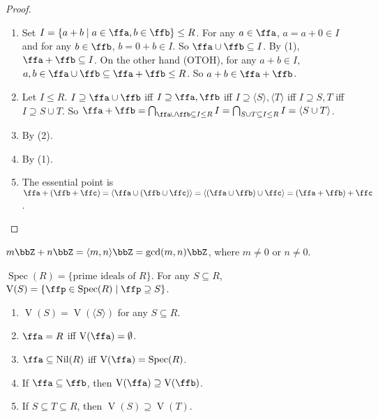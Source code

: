 \begin{proof}
    \begin{enumerate}[(1)]
        \item 
            Set $I = \{a+b \mid a \in \ffa,b \in \ffb\} \leq R$. For any $a \in \ffa$, $a = a + 0 \in I$ and for any $b \in \ffb$, $b = 0 + b \in I$. So $\ffa \cup \ffb \subseteq I$. By (1), $\ffa + \ffb \subseteq I$. On the other hand (OTOH), for any $a+b \in I$, $a,b \in \ffa \cup \ffb \subseteq \ffa + \ffb \leq R$. So $a + b \in \ffa + \ffb$.
        \item Let $I \leq R$. $I \supseteq \ffa \cup \ffb$ iff $I \supseteq \ffa,\ffb$ iff $I \supseteq \langle S \rangle, \langle T \rangle$ iff $I \supseteq S,T$ iff $I \supseteq S \cup T$. So $\ffa + \ffb = \bigcap_{\ffa \cup \ffb \subseteq I \leq R} I = \bigcap_{S \cup T \subseteq I \leq R} I = \langle S \cup T \rangle$.
        \item By (2).
        \item By (1).
        \item The essential point is $\ffa + (\ffb + \ffc) = \langle \ffa \cup (\ffb \cup \ffc) \rangle = \langle (\ffa \cup \ffb) \cup \ffc \rangle = (\ffa + \ffb) + \ffc$.
    \end{enumerate}
\end{proof}

\begin{example}
    $m\bbZ + n\bbZ = \langle m,n \rangle\bbZ = \operatorname{gcd}(m,n)\bbZ$, where $m \neq 0$ or $n \neq 0$.
\end{example}

\begin{remark}[Recall]
    $\operatorname{Spec}(R) = \{\text{prime ideals of $R$}\}$. For any $S \subseteq R$, $\operatorname{V}(S) = \{\ffp \in \operatorname{Spec}(R) \mid \ffp \supseteq S\}$.
\end{remark}

\begin{proposition}
    \begin{enumerate}[(1)]
        \item $\operatorname{V}(S) = \operatorname{V}(\langle S \rangle)$ for any $S \subseteq R$.
        \item $\ffa = R$ iff $\operatorname{V}(\ffa) = \emptyset$.
        \item $\ffa \subseteq \operatorname{Nil}(R)$ iff $\operatorname{V}(\ffa) = \operatorname{Spec}(R)$.
        \item If $\ffa \subseteq \ffb$, then $\operatorname{V}(\ffa) \supseteq \operatorname{V}(\ffb)$. 
        \item If $S \subseteq T \subseteq R$, then $\operatorname{V}(S) \supseteq \operatorname{V}(T)$.
    \end{enumerate}
\end{proposition}

